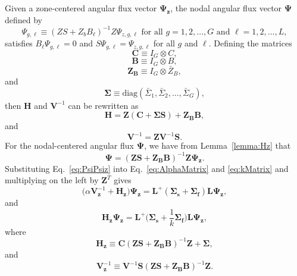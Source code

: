 Given a zone-centered angular flux vector $\mathbf{\Psi_{z}}$, the nodal angular flux vector $\mathbf{\Psi}$ defined by
\begin{equation}
	\Psi_{g,\ell} \equiv (ZS + Z_{b}B_{\ell})^{-1}Z \Psi_{z,g,\ell} \text{ for all } g = 1, 2, \dots, G \text{ and } \ell = 1, 2, \dots, L,
\end{equation}
satisfies $B_{\ell} \Psi_{g,\ell} = 0$ and $S \Psi_{g,\ell} = \Psi_{z,g,\ell}$ for all $g$ and $\ell$. Defining the matrices
\begin{equation}
	\mathbf{C} \equiv I_{G} \otimes C,
\end{equation}
\begin{equation}
	\mathbf{B} \equiv I_{G} \otimes B,
\end{equation}
\begin{equation}
	\mathbf{Z_{B}} \equiv I_{G} \otimes \bar{Z}_{B},
\end{equation}
and
\begin{equation}
	\mathbf{\Sigma} \equiv \text{diag}(\bar{\Sigma}_{1}, \bar{\Sigma}_{2}, \dots, \bar{\Sigma}_{G}),
\end{equation}
then $\mathbf{H}$ and $\mathbf{V}^{-1}$ can be rewritten as
\begin{equation}
	\mathbf{H} = \mathbf{Z}(\mathbf{C} + \mathbf{\Sigma S}) + \mathbf{Z_{B} B},
\end{equation}
and
\begin{equation}
	\mathbf{V}^{-1} = \mathbf{Z}\mathbf{V}^{-1} \mathbf{S}.
\end{equation}
For the nodal-centered angular flux $\mathbf{\Psi}$, we have from Lemma~\ref{lemma:Hz} that
\begin{equation}
	\mathbf{\Psi} = (\mathbf{ZS} + \mathbf{Z_{B}B})^{-1}\mathbf{Z}\mathbf{\Psi_{z}}.
	\label{eq:PsiPsiz}
\end{equation}
Substituting Eq.~\ref{eq:PsiPsiz} into Eq.~\ref{eq:AlphaMatrix} and \ref{eq:kMatrix} and multiplying on the left by $\mathbf{Z}^{T}$ gives
\begin{equation}
	\big ( \alpha \mathbf{V}_\mathbf{z}^{-1} + \mathbf{H_{z}} \big ) \mathbf{\Psi_{z}} = \mathbf{L}^{+}( \mathbf{\Sigma_{s}} + \mathbf{\Sigma_{f}}) \mathbf{L} \mathbf{\Psi_{z}},
	\label{eq:AlphaZ}
\end{equation}
and
\begin{equation}
	\mathbf{H_{z}} \mathbf{\Psi_{z}} = \mathbf{L}^{+} \bigg ( \mathbf{\Sigma_{s}} + \frac{1}{k}\mathbf{\Sigma_{f}} \bigg ) \mathbf{L} \mathbf{\Psi_{z}},
	\label{eq:kZ}
\end{equation}
where
\begin{equation}
	\mathbf{H_{z}} \equiv \mathbf{C}(\mathbf{ZS} + \mathbf{Z_{B}B})^{-1}\mathbf{Z} + \mathbf{\Sigma},
\end{equation}
and
\begin{equation}
	\mathbf{V}_{\mathbf{z}}^{-1} \equiv \mathbf{V}^{-1} \mathbf{S} (\mathbf{ZS} + \mathbf{Z_{B}B})^{-1}\mathbf{Z}.
\end{equation}

